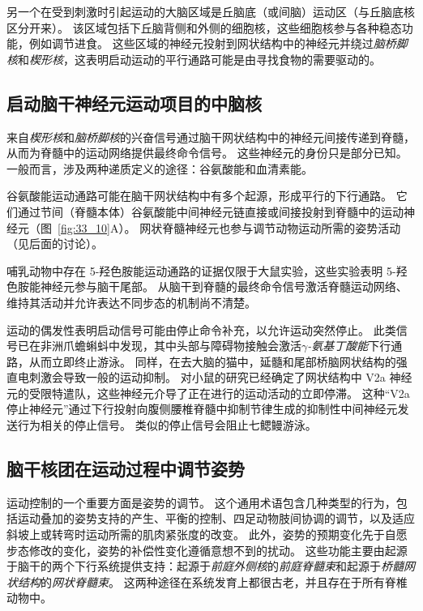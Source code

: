 另一个在受到刺激时引起运动的大脑区域是丘脑底（或间脑）运动区（与丘脑底核区分开来）。
该区域包括下丘脑背侧和外侧的细胞核，这些细胞核参与各种稳态功能，例如调节进食。
这些区域的神经元投射到网状结构中的神经元并绕过\textit{脑桥脚核}和\textit{楔形核}，这表明启动运动的平行通路可能是由寻找食物的需要驱动的。



\subsection{启动脑干神经元运动项目的中脑核}

来自\textit{楔形核}和\textit{脑桥脚核}的兴奋信号通过脑干网状结构中的神经元间接传递到脊髓，从而为脊髓中的运动网络提供最终命令信号。
这些神经元的身份只是部分已知。
一般而言，涉及两种递质定义的途径：谷氨酸能和血清素能。


谷氨酸能运动通路可能在脑干网状结构中有多个起源，形成平行的下行通路。
它们通过节间（脊髓本体）谷氨酸能中间神经元链直接或间接投射到脊髓中的运动神经元（图~\ref{fig:33_10}A）。
网状脊髓神经元也参与调节动物运动所需的姿势活动（见后面的讨论）。


哺乳动物中存在 5-羟色胺能运动通路的证据仅限于大鼠实验，这些实验表明 5-羟色胺能神经元参与脑干尾部。
从脑干到脊髓的最终命令信号激活脊髓运动网络、维持其活动并允许表达不同步态的机制尚不清楚。


运动的偶发性表明启动信号可能由停止命令补充，以允许运动突然停止。
此类信号已在非洲爪蟾蝌蚪中发现，其中头部与障碍物接触会激活\textit{$\gamma$-氨基丁酸能}下行通路，从而立即终止游泳。
同样，在去大脑的猫中，延髓和尾部桥脑网状结构的强直电刺激会导致一般的运动抑制。
对小鼠的研究已经确定了网状结构中 V2a 神经元的受限特遣队，这些神经元介导了正在进行的运动活动的立即停滞。
这种“V2a 停止神经元”通过下行投射向腹侧腰椎脊髓中抑制节律生成的抑制性中间神经元发送行为相关的停止信号。
类似的停止信号会阻止七鳃鳗游泳。



\subsection{脑干核团在运动过程中调节姿势}

运动控制的一个重要方面是姿势的调节。
这个通用术语包含几种类型的行为，包括运动叠加的姿势支持的产生、平衡的控制、四足动物肢间协调的调节，以及适应斜坡上或转弯时运动所需的肌肉紧张度的改变。
此外，姿势的预期变化先于自愿步态修改的变化，姿势的补偿性变化遵循意想不到的扰动。
这些功能主要由起源于脑干的两个下行系统提供支持：起源于\textit{前庭外侧核}的\textit{前庭脊髓束}和起源于\textit{桥髓网状结构}的\textit{网状脊髓束}。
这两种途径在系统发育上都很古老，并且存在于所有脊椎动物中。


